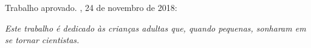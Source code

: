 \documentclass[
	12pt,				%
	openright,			%
	oneside,			%
	a4paper,			%
	english,			%
	french,				%
	spanish,			%
	brazil				%
	]{abntex2}
\begin{document}
	\begin{folhadeaprovacao}
	
	\begin{center}
	{\ABNTEXchapterfont\large\imprimirautor}
	
	\vspace*{\fill}\vspace*{\fill}
	\begin{center}
	\ABNTEXchapterfont\bfseries\Large\imprimirtitulo
	\end{center}
	\vspace*{\fill}
	
	\hspace{.45\textwidth}
	\begin{minipage}{.5\textwidth}
	\imprimirpreambulo
	\end{minipage}%
	\vspace*{\fill}
	\end{center}
	
	Trabalho aprovado. \imprimirlocal, 24 de novembro de 2018:
	
	
	\begin{center}
	\vspace*{0.5cm}
	{\large\imprimirlocal}
	\par
	{\large\imprimirdata}
	\vspace*{1cm}
	\end{center}
	
	\end{folhadeaprovacao}
	

\begin{dedicatoria}
	\textit{Este trabalho é dedicado às crianças adultas que, quando pequenas, sonharam em se tornar cientistas.}
	\begin{comment}
		   \vspace*{\fill}
		   \centering
		   \noindent
		   \textit{ Este trabalho é dedicado às crianças adultas que,\\
		   quando pequenas, sonharam em se tornar cientistas.} \vspace*{\fill}
	\end{comment}

\end{dedicatoria}
\end{document}
